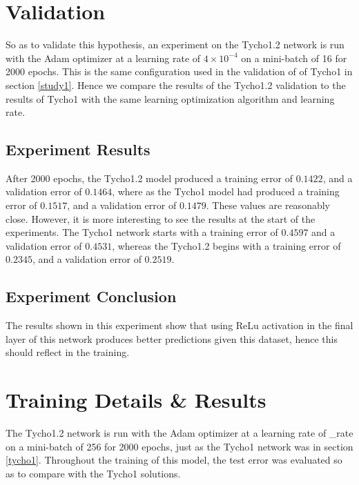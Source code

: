 \documentclass[12pt,a4paper,oneside,oldfontcommands]{memoir}
\begin{document}
\begin{Declaration Of OriginalityOrginality}
\section{Validation}

So as to validate this hypothesis, an experiment on the Tycho1.2 network is run with the Adam optimizer at a learning rate of \(4\times10^{-4}\) on a mini-batch of 16 for 2000 epochs. This is the same configuration used in the validation of of Tycho1 in section \ref{study1}. Hence we compare the results of the Tycho1.2 validation to the results of Tycho1 with the same learning optimization algorithm and learning rate.

\subsection{Experiment Results}

After 2000 epochs, the Tycho1.2 model produced a training error of \(0.1422\), and a validation error of \(0.1464\), where as the Tycho1 model had produced a training error of \(0.1517\), and a validation error of \(0.1479\). These values are reasonably close. However, it is more interesting to see the results at the start of the experiments. The Tycho1 network starts with a training error of \(0.4597\) and a validation error of \(0.4531\), whereas the Tycho1.2 begins with a training error of \(0.2345\), and a validation error of \(0.2519\). 

\subsection{Experiment Conclusion}

The results shown in this experiment show that using ReLu activation in the final layer of this network produces better predictions given this dataset, hence this should reflect in the training. 

\section{Training Details \& Results}

The Tycho1.2 network is run with the Adam optimizer at a learning rate of \learning_rate on a mini-batch of 256 for 2000 epochs, just as the Tycho1 network was in section \ref{tycho1}. Throughout the training of this model, the test error was evaluated so as to compare with the Tycho1 solutions. 


\end{Declaration Of OriginalityOrginality}
\end{document}
